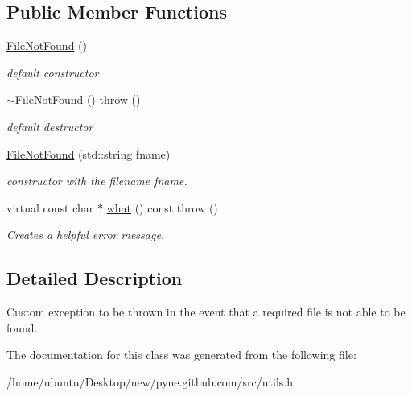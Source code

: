 \subsection*{Public Member Functions}
\begin{DoxyCompactItemize}
\item 
\hyperlink{classpyne_1_1_file_not_found_aaae1bdf04df2b68377ae453929c8eb56}{File\+Not\+Found} ()\hypertarget{classpyne_1_1_file_not_found_aaae1bdf04df2b68377ae453929c8eb56}{}\label{classpyne_1_1_file_not_found_aaae1bdf04df2b68377ae453929c8eb56}

\begin{DoxyCompactList}\small\item\em default constructor \end{DoxyCompactList}\item 
\hyperlink{classpyne_1_1_file_not_found_abc00e9c8711bb1b1bb2dc1dfd3a98745}{$\sim$\+File\+Not\+Found} ()  throw ()\hypertarget{classpyne_1_1_file_not_found_abc00e9c8711bb1b1bb2dc1dfd3a98745}{}\label{classpyne_1_1_file_not_found_abc00e9c8711bb1b1bb2dc1dfd3a98745}

\begin{DoxyCompactList}\small\item\em default destructor \end{DoxyCompactList}\item 
\hyperlink{classpyne_1_1_file_not_found_a4d766115c01634b77aebe42269f9aead}{File\+Not\+Found} (std\+::string fname)\hypertarget{classpyne_1_1_file_not_found_a4d766115c01634b77aebe42269f9aead}{}\label{classpyne_1_1_file_not_found_a4d766115c01634b77aebe42269f9aead}

\begin{DoxyCompactList}\small\item\em constructor with the filename {\itshape fname}. \end{DoxyCompactList}\item 
virtual const char $\ast$ \hyperlink{classpyne_1_1_file_not_found_a55d410139d5853e8988d073637845cbd}{what} () const   throw ()\hypertarget{classpyne_1_1_file_not_found_a55d410139d5853e8988d073637845cbd}{}\label{classpyne_1_1_file_not_found_a55d410139d5853e8988d073637845cbd}

\begin{DoxyCompactList}\small\item\em Creates a helpful error message. \end{DoxyCompactList}\end{DoxyCompactItemize}


\subsection{Detailed Description}
Custom exception to be thrown in the event that a required file is not able to be found. 

The documentation for this class was generated from the following file\+:\begin{DoxyCompactItemize}
\item 
/home/ubuntu/\+Desktop/new/pyne.\+github.\+com/src/utils.\+h\end{DoxyCompactItemize}
